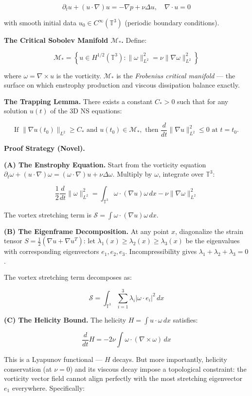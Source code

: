 \documentclass[10pt,a4paper]{article}
\begin{document}
\[\partial_t u + (u \cdot \nabla)u = -\nabla p + \nu \Delta u, \quad \nabla \cdot u = 0\]

with smooth initial data $u_0 \in C^\infty(\mathbb{T}^3)$ (periodic boundary conditions).

\textbf{The Critical Sobolev Manifold $\mathcal{M}_*$.} Define:

\[\mathcal{M}_* = \left\{ u \in H^{1/2}(\mathbb{T}^3) : \|\omega\|_{L^2}^2 = \nu \|\nabla \omega\|_{L^2}^2 \right\}\]

where $\omega = \nabla \times u$ is the vorticity. $\mathcal{M}_*$ is the \emph{Frobenius critical manifold} --- the surface on which enstrophy production and viscous dissipation balance exactly.

\textbf{The Trapping Lemma.} There exists a constant $C_* > 0$ such that for any solution $u(t)$ of the 3D NS equations:

\[\text{If } \|\nabla u(t_0)\|_{L^2} \geq C_* \text{ and } u(t_0) \in \mathcal{M}_*, \text{ then } \frac{d}{dt}\|\nabla u\|_{L^2}^2 \leq 0 \text{ at } t = t_0.\]

\textbf{Proof Strategy (Novel).}

\textbf{(A) The Enstrophy Equation.} Start from the vorticity equation $\partial_t \omega + (u \cdot \nabla)\omega = (\omega \cdot \nabla)u + \nu \Delta \omega$. Multiply by $\omega$, integrate over $\mathbb{T}^3$:

\[\frac{1}{2}\frac{d}{dt}\|\omega\|_{L^2}^2 = \int_{\mathbb{T}^3} \omega \cdot (\nabla u) \omega \, dx - \nu \|\nabla \omega\|_{L^2}^2\]

The vortex stretching term is $\mathcal{S} = \int \omega \cdot (\nabla u) \omega \, dx$.

\textbf{(B) The Eigenframe Decomposition.} At any point $x$, diagonalize the strain tensor $S = \frac{1}{2}(\nabla u + \nabla u^T)$: let $\lambda_1(x) \geq \lambda_2(x) \geq \lambda_3(x)$ be the eigenvalues with corresponding eigenvectors $e_1, e_2, e_3$. Incompressibility gives $\lambda_1 + \lambda_2 + \lambda_3 = 0$.

The vortex stretching term decomposes as:

\[\mathcal{S} = \int_{\mathbb{T}^3} \sum_{i=1}^3 \lambda_i |\omega \cdot e_i|^2 \, dx\]

\textbf{(C) The Helicity Bound.} The helicity $H = \int u \cdot \omega \, dx$ satisfies:

\[\frac{d}{dt}H = -2\nu \int \omega \cdot (\nabla \times \omega) \, dx\]

This is a Lyapunov functional --- $H$ decays. But more importantly, helicity conservation (at $\nu = 0$) and its viscous decay impose a topological constraint: the vorticity vector field cannot align perfectly with the most stretching eigenvector $e_1$ everywhere. Specifically:
\end{document}
